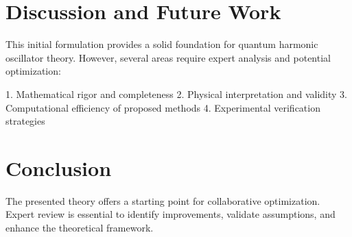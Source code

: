 \documentclass{article}
\begin{document}
\section{Discussion and Future Work}
This initial formulation provides a solid foundation for quantum harmonic oscillator theory. However, several areas require expert analysis and potential optimization:

1. Mathematical rigor and completeness
2. Physical interpretation and validity
3. Computational efficiency of proposed methods
4. Experimental verification strategies

\section{Conclusion}
The presented theory offers a starting point for collaborative optimization. Expert review is essential to identify improvements, validate assumptions, and enhance the theoretical framework.
\end{document}
